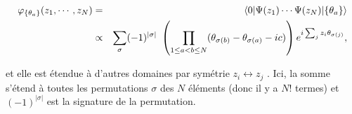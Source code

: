 \begin{eqnarray}
	\varphi_{\{\theta_a\}} ( z_1 , \cdots , z_N ) & = & \langle 0 \vert \Psi ( z_1 ) \cdots \Psi (z_N ) \vert \{ \theta_a \} \rangle \notag\\
	& \propto & \sum_\sigma ( - 1 ) ^{ \vert \sigma \vert } \left ( \prod_{ 1 \leq a < b \leq N } ( \theta_{\sigma(b)} - \theta_{\sigma(a)} - ic ) \right ) e^{i \sum_j z_i \theta_{ \sigma(j)}}\label{eq:I-2-17},
\end{eqnarray}

et elle est étendue à d'autres domaines par symétrie $z_i \leftrightarrow z_j$ . Ici, la somme s'étend à toutes les permutations $\sigma$ des $N$ éléments (donc il y a $N!$ termes) et $(-1)^{|\sigma|}$ est la signature de la permutation. %







